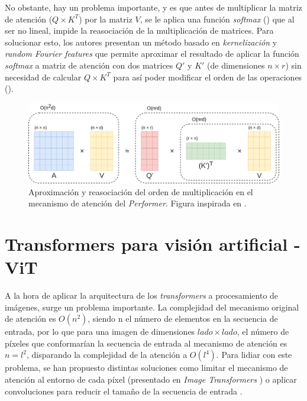 No obstante, hay un problema importante, y es que antes de multiplicar la matriz de atención ($Q \times K^T$) por la matriz $V$, se le aplica una función \textit{softmax} () que al ser no lineal, impide la reasociación de la multiplicación de matrices. Para solucionar esto, los autores presentan un método basado en \textit{kernelización} y \textit{random Fourier features} que permite aproximar el resultado de aplicar la función \textit{softmax} a matriz de atención con dos matrices $Q'$ y $K'$ (de dimensiones $n \times r$) sin necesidad de calcular $Q \times K^T$ para así poder modificar el orden de las operaciones (). 

\vspace{-3mm}

\begin{figure}[H]
\centering
\includegraphics[width=1\linewidth]{imagenes/performer2.png} 
\captionsetup{width=1\linewidth}
\caption{Aproximación y reasociación del orden de multiplicación en el mecanismo de atención del \textit{Performer}. Figura inspirada en \cite{performers}.}
\label{fig:performer}
\end{figure}


\section{Transformers para visión artificial - ViT}
A la hora de aplicar la arquitectura de los \textit{transformers} a procesamiento de imágenes, surge un problema importante. La complejidad del mecanismo original de atención es $O(n^{2})$, siendo n el número de elementos en la secuencia de entrada, por lo que para una imagen de dimensiones $lado \times lado$, el número de píxeles que conformarían la secuencia de entrada al mecanismo de atención es $n = l^2$, disparando la complejidad de la atención a $O(l^{4})$. Para lidiar con este problema, se han propuesto distintas soluciones como limitar el mecanismo de atención al entorno de cada píxel (presentado en \textit{Image Transformers} \cite{image_transformer}) o aplicar convoluciones para reducir el tamaño de la secuencia de entrada \cite{detrfacebookdetectiontransformers}. 

